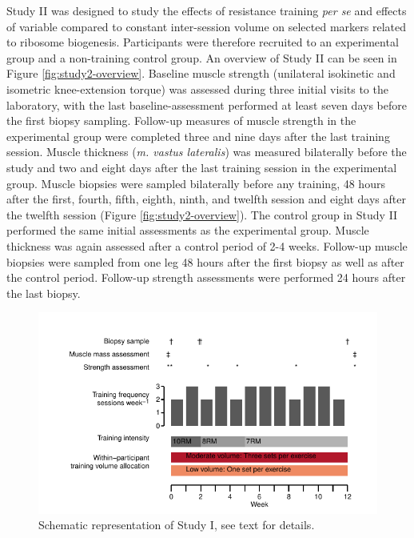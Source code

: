 \documentclass[twoside,10pt]{gihclass} %
\begin{document}
Study II was designed to study the effects of resistance training \emph{per se} and effects of variable compared to constant inter-session volume on selected markers related to ribosome biogenesis.
Participants were therefore recruited to an experimental group and a non-training control group.
An overview of Study II can be seen in Figure \ref{fig:study2-overview}.
Baseline muscle strength (unilateral isokinetic and isometric knee-extension torque) was assessed during three initial visits to the laboratory, with the last baseline-assessment performed at least seven days before the first biopsy sampling. Follow-up measures of muscle strength in the experimental group were completed three and nine days after the last training session.
Muscle thickness (\emph{m. vastus lateralis}) was measured bilaterally before the study and two and eight days after the last training session in the experimental group.
Muscle biopsies were sampled bilaterally before any training, 48 hours after the first, fourth, fifth, eighth, ninth, and twelfth session and eight days after the twelfth session (Figure \ref{fig:study2-overview}).
The control group in Study II performed the same initial assessments as the experimental group. Muscle thickness was again assessed after a control period of 2-4 weeks.
Follow-up muscle biopsies were sampled from one leg 48 hours after the first biopsy as well as after the control period. Follow-up strength assessments were performed 24 hours after the last biopsy.
\begin{figure}

{\centering \includegraphics{thesis_files/figure-latex/study1-overview-1} 

}

\caption[Study I, schematic overview]{Schematic representation of Study I, see text for details.}\label{fig:study1-overview}
\end{figure}
\end{document}
